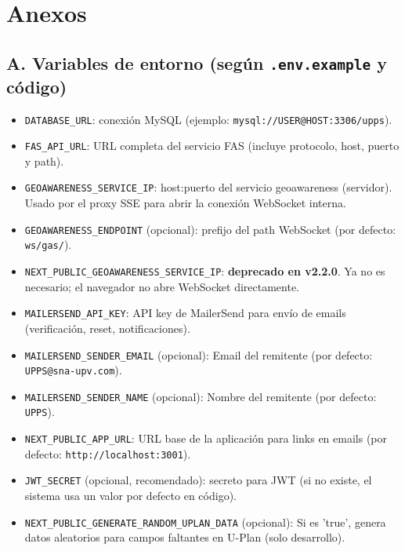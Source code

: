\documentclass[12pt,a4paper]{article}
\begin{document}
\section*{Anexos}
\subsection*{A. Variables de entorno (según \texttt{.env.example} y código)}
\begin{itemize}
    \item \texttt{DATABASE\_URL}: conexión MySQL (ejemplo: \texttt{mysql://USER@HOST:3306/upps}).
    \item \texttt{FAS\_API\_URL}: URL completa del servicio FAS (incluye protocolo, host, puerto y path).
    \item \texttt{GEOAWARENESS\_SERVICE\_IP}: host:puerto del servicio geoawareness (servidor). Usado por el proxy SSE para abrir la conexión WebSocket interna.
    \item \texttt{GEOAWARENESS\_ENDPOINT} (opcional): prefijo del path WebSocket (por defecto: \texttt{ws/gas/}).
    \item \texttt{NEXT\_PUBLIC\_GEOAWARENESS\_SERVICE\_IP}: \textbf{deprecado en v2.2.0}. Ya no es necesario; el navegador no abre WebSocket directamente.
    \item \texttt{MAILERSEND\_API\_KEY}: API key de MailerSend para envío de emails (verificación, reset, notificaciones).
    \item \texttt{MAILERSEND\_SENDER\_EMAIL} (opcional): Email del remitente (por defecto: \texttt{UPPS@sna-upv.com}).
    \item \texttt{MAILERSEND\_SENDER\_NAME} (opcional): Nombre del remitente (por defecto: \texttt{UPPS}).
    \item \texttt{NEXT\_PUBLIC\_APP\_URL}: URL base de la aplicación para links en emails (por defecto: \texttt{http://localhost:3001}).
    \item \texttt{JWT\_SECRET} (opcional, recomendado): secreto para JWT (si no existe, el sistema usa un valor por defecto en código).
    \item \texttt{NEXT\_PUBLIC\_GENERATE\_RANDOM\_UPLAN\_DATA} (opcional): Si es 'true', genera datos aleatorios para campos faltantes en U-Plan (solo desarrollo).
\end{itemize}
\end{document}
